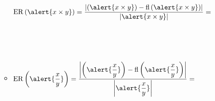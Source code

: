 \begin{frame}
\begin{solution}
\begin{enumerate}[d)]
\begin{itemize}
				            \begin{math}
					            \operatorname{ER}
					            \left(\alert{x\times y}\right)=
					            \dfrac{
						            \left|
						            \left(\alert{x\times y}\right)-
						            \operatorname{fl}
						            \left(\alert{x\times y}\right)
						            \right|
					            }{
						            \left|
						            \alert{x\times y}
						            \right|
					            }=
				            \end{math}

				            \

				            \

				      \item

				            \begin{math}
					            \operatorname{ER}
					            \left(\alert{\dfrac{x}{y}}\right)=
					            \dfrac{
						            \left|
						            \left(\alert{\dfrac{x}{y}}\right)-
						            \operatorname{fl}
						            \left(\alert{\dfrac{x}{y}}\right)
						            \right|
					            }{
						            \left|
						            \alert{\dfrac{x}{y}}
						            \right|
					            }=
				            \end{math}
			      \end{itemize}
		\end{enumerate}
	\end{solution}
\end{frame}